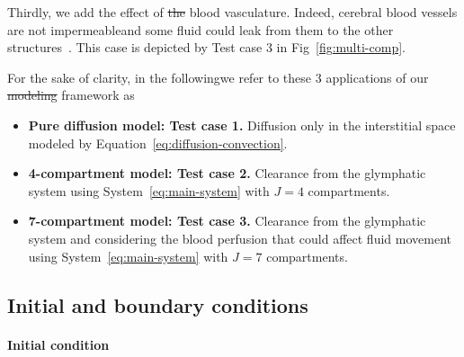 \documentclass[a4paper,11pt]{article} %
\newcommand{\1}{^{(1)}}
\newcommand{\2}{^{(2)}}
\providecommand{\DIFaddtex}[1]{{\protect\color{blue}\uwave{#1}}} %
\providecommand{\DIFdeltex}[1]{{\protect\color{red}\sout{#1}}}                      %
\providecommand{\DIFaddbegin}{} %
\providecommand{\DIFaddend}{} %
\providecommand{\DIFdelbegin}{} %
\providecommand{\DIFdelend}{} %
\providecommand{\DIFadd}[1]{\texorpdfstring{\DIFaddtex{#1}}{#1}} %
\providecommand{\DIFdel}[1]{\texorpdfstring{\DIFdeltex{#1}}{}} %
\newcommand{\DIFscaledelfig}{0.5}
\newlength{\DIFdelgraphicswidth} %
\newlength{\DIFdelgraphicsheight} %
\newcommand{\DIFaddincludegraphics}[2][]{{\color{blue}\fbox{\DIFOincludegraphics[#1]{#2}}}} %
\newcommand{\DIFdelincludegraphics}[2][]{%
\sbox{\DIFdelgraphicsbox}{\DIFOincludegraphics[#1]{#2}}%
\settoboxwidth{\DIFdelgraphicswidth}{\DIFdelgraphicsbox} %
\settoboxtotalheight{\DIFdelgraphicsheight}{\DIFdelgraphicsbox} %
\scalebox{\DIFscaledelfig}{%
\parbox[b]{\DIFdelgraphicswidth}{\usebox{\DIFdelgraphicsbox}\\[-\baselineskip] \rule{\DIFdelgraphicswidth}{0em}}\llap{\resizebox{\DIFdelgraphicswidth}{\DIFdelgraphicsheight}{%
\setlength{\unitlength}{\DIFdelgraphicswidth}%
\begin{picture}(1,1)%
\thicklines\linethickness{2pt} %
{\color[rgb]{1,0,0}\put(0,0){\framebox(1,1){}}}%
{\color[rgb]{1,0,0}\put(0,0){\line( 1,1){1}}}%
{\color[rgb]{1,0,0}\put(0,1){\line(1,-1){1}}}%
\end{picture}%
}\hspace*{3pt}}} %
} %
\DeclareRobustCommand{\DIFaddbegin}{\DIFOaddbegin \let\includegraphics\DIFaddincludegraphics} %
\DeclareRobustCommand{\DIFaddend}{\DIFOaddend \let\includegraphics\DIFOincludegraphics} %
\DeclareRobustCommand{\DIFdelbegin}{\DIFOdelbegin \let\includegraphics\DIFdelincludegraphics} %
\DeclareRobustCommand{\DIFdelend}{\DIFOaddend \let\includegraphics\DIFOincludegraphics} %
\begin{document}
Thirdly, we add the effect of \DIFdelbegin \DIFdel{the }\DIFdelend blood vasculature. Indeed, cerebral blood vessels are not impermeable\DIFaddbegin \DIFadd{, }\DIFaddend and some fluid could leak from them to the other structures~\cite{Oreskovic-2010-formation}. This case is depicted by Test case 3 in Fig~\ref{fig:multi-comp}. 

For the sake of clarity, in the following\DIFaddbegin \DIFadd{, }\DIFaddend we refer to these $3$ applications of our \DIFdelbegin \DIFdel{modeling }\DIFdelend \DIFaddbegin \DIFadd{modelling }\DIFaddend framework as
\begin{itemize}
    \item \textbf{Pure diffusion model: Test case 1.} Diffusion only in the interstitial space modeled by Equation~\eqref{eq:diffusion-convection}. 
    \item \textbf{4-compartment model: Test case 2.} Clearance from the glymphatic system using System~\eqref{eq:main-system} with $J=4$ compartments. 
    \item \textbf{7-compartment model: Test case 3.} Clearance from the glymphatic system and considering the blood perfusion that could affect fluid movement using System~\eqref{eq:main-system} with $J=7$ compartments. 
\end{itemize}


\subsection{Initial and boundary conditions} \label{subsec:Init-bound}
\paragraph{Initial condition}
\end{document}
